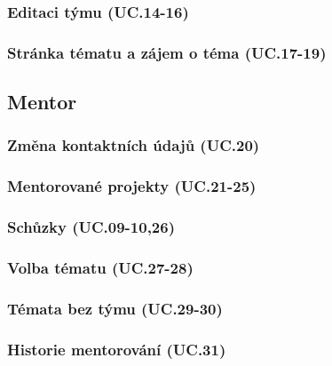 \documentclass[czech,BP]{thesiskiv}
\begin{document}
			\subsubsection{Editaci týmu (UC.14-16)}
				\par
			\subsubsection{Stránka tématu a zájem o téma (UC.17-19)}
				\par
		\subsection{Mentor}
			\subsubsection{Změna kontaktních údajů (UC.20)}
				\par
			\subsubsection{Mentorované projekty (UC.21-25)}
				\par
			\subsubsection{Schůzky (UC.09-10,26)}
				\par
			\subsubsection{Volba tématu (UC.27-28)}
				\par
			\subsubsection{Témata bez týmu (UC.29-30)}
				\par
			\subsubsection{Historie mentorování (UC.31)}
\end{document}
